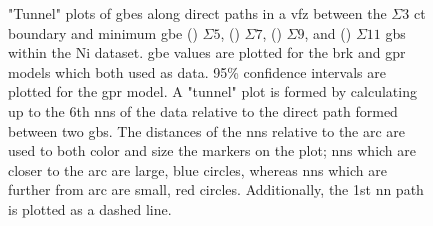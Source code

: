 \documentclass[final,twocolumn,12pt]{elsarticle}
\begin{document}
\begin{figure}[!htb]
\begin{subfigure}[b]{0.4\textwidth}
			\caption{}
			\label{fig:tunnel-3-11-olmsted}
		\end{subfigure}
		\caption{"Tunnel" plots of \glspl{gbe} along direct paths in a \gls{vfz} between the $\Sigma3$ \gls{ct} boundary and minimum \gls{gbe} () $\Sigma5$, () $\Sigma7$, () $\Sigma9$, and () $\Sigma11$ \glspl{gb} within the Ni \citet{olmstedSurveyComputedGrain2009} dataset. \Gls{gbe} values are plotted for the \gls{brk} and \gls{gpr} models which both used \citet{olmstedSurveyComputedGrain2009} as \inpt{} data. 95\% confidence intervals are plotted for the \gls{gpr} model. A "tunnel" plot is formed by calculating up to the 6th \glspl{nn} of the \inpt{} data relative to the direct path formed between two \glspl{gb}. The distances of the \glspl{nn} relative to the arc are used to both color and size the markers on the plot; \glspl{nn} which are closer to the arc are large, blue circles, whereas \glspl{nn} which are further from arc are small, red circles. Additionally, the 1st \gls{nn} path is plotted as a dashed line.}
		\label{fig:sigma-tunnels-olmsted}
	\end{figure}
	
\end{document}
